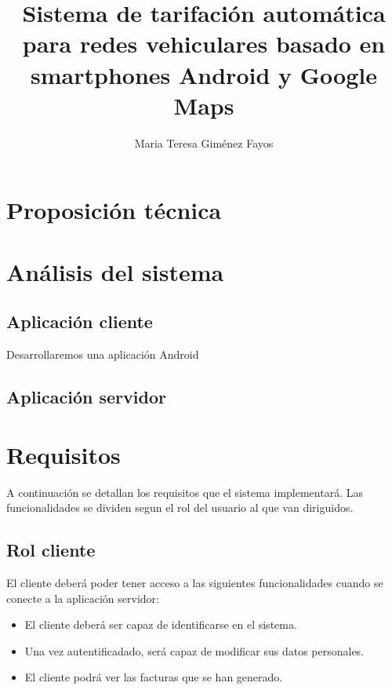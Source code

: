 \documentclass[spanish,a4paper,10pt]{article}
\title{Sistema de tarifación automática para redes vehiculares basado en smartphones Android y Google Maps }
\author{Maria Teresa Giménez Fayos}
\begin{document}
\maketitle

\begin{abstract}

\end{abstract}

\section{Proposición técnica}
  
\section{Análisis del sistema}
  \subsection{Aplicación cliente}
  Desarrollaremos una aplicación Android
  \subsection{Aplicación servidor}

\section{Requisitos}
A continuación se detallan los requisitos que el sistema implementará. Las funcionalidades se dividen segun el rol del usuario al que van diriguidos. 

\subsection{Rol cliente}

El cliente deberá poder tener acceso a las siguientes funcionalidades cuando se conecte a la aplicación servidor:
\begin{itemize}
 \item El cliente deberá ser capaz de identificarse en el sistema.
 \item Una vez autentificadado, será capaz de modificar sus datos personales.
 \item El cliente podrá ver las facturas que se han generado.
\end{itemize}
\end{document}
